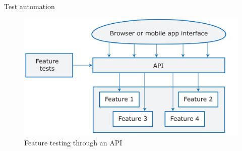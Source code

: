 \documentclass{beamer}
\begin{document}
\begin{frame}{Test automation}
	\begin{figure}
		\includegraphics[scale=.4]{img/m3_30}
		\caption{Feature testing through an API}
	\end{figure}
\end{frame}
\end{document}
